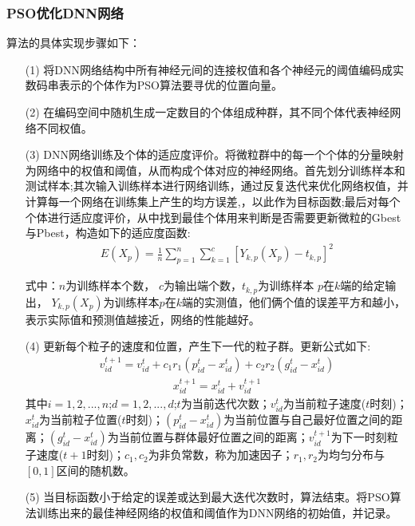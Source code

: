 \documentclass{whutmod}
\begin{document}
	\subsubsection{PSO优化DNN网络}
	算法的具体实现步骤如下：
	\begin{itemize}
		\item [(1)]将DNN网络结构中所有神经元间的连接权值和各个神经元的阈值编码成实数码串表示的个体作为PSO算法要寻优的位置向量。
		\item [(2)]在编码空间中随机生成一定数目的个体组成种群，其不同个体代表神经网络不同权值。
		\item [(3)]DNN网络训练及个体的适应度评价。将微粒群中的每一个个体的分量映射为网络中的权值和阈值，从而构成个体对应的神经网络。首先划分训练样本和测试样本;其次输入训练样本进行网络训练，通过反复迭代来优化网络权值，并计算每一个网络在训练集上产生的均方误差,，以此作为目标函数;最后对每个个体进行适应度评价，从中找到最佳个体用来判断是否需要更新微粒的Gbest与Pbest，构造如下的适应度函数:
			\begin{gather}
		E\left(X_{p}\right)=\frac{1}{n} \sum_{p=1}^{n} \sum_{k=1}^{c}\left[Y_{k, p}\left(X_{p}\right)-t_{k, p}\right]^{2}
		\end{gather}
		
		式中：$n$为训练样本个数，
		$c$为输出端个数，$t_{k,p}$为训练样本
		$p$在$k$端的给定输出，
		$Y_{k,p}\left(X_{p}\right)$为训练样本$p$在$k$端的实测值，他们俩个值的误差平方和越小，表示实际值和预测值越接近，网络的性能越好。
		
		\item [(4)]更新每个粒子的速度和位置，产生下一代的粒子群。更新公式如下:
		\begin{gather}
		v_{id}^{t+1}=v_{id}^{t}+c_{1}r_{1}(p_{id}^{t}-x_{id}^{t})+c_{2}r_{2}(g_{id}^{t}-x_{id}^{t})
		\end{gather}	
		\begin{gather}
		x_{id}^{t+1}=x_{id}^{t}+v_{id}^{t+1}
		\end{gather}
		其中$i=1,2,...,n$;$d=1,2,...,d$;$t$为当前迭代次数；$v_{id}^{t}$为当前粒子速度($t$时刻)；$x_{id}^{t}$为当前粒子位置($t$时刻)；$(p_{id}^{t}-x_{id}^{t})$为当前位置与自己最好位置之间的距离；$(g_{id}^{t}-x_{id}^{t})$为当前位置与群体最好位置之间的距离；$v_{id}^{t+1}$为下一时刻粒子速度($t+1$时刻)；$c_{1},c_{2}$为非负常数，称为加速因子；$r_{1},r_{2}$为均匀分布与$[0,1]$区间的随机数。
		
		\item [(5)]当目标函数小于给定的误差或达到最大迭代次数时，算法结束。将PSO算法训练出来的最佳神经网络的权值和阈值作为DNN网络的初始值，并记录。
		
	
	\end{itemize}
	
\end{document}
